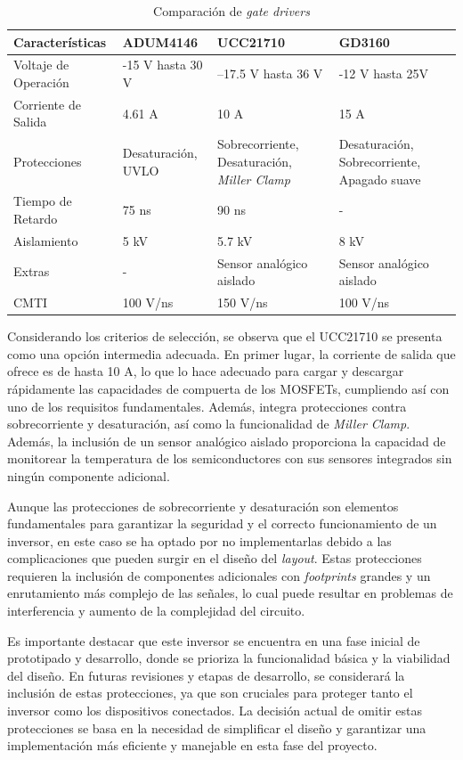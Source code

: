 \begin{table}[H]
	\centering
	\begin{tabular}{|l|p{3.5cm}|p{3.5cm}|p{3.5cm}|}
		\hline
		\textbf{Características} & \textbf{ADUM4146} & \textbf{UCC21710} & \textbf{GD3160} \\
		\hline
		Voltaje de Operación & -15 V hasta 30 V & –17.5 V hasta 36 V & -12 V hasta 25V \\
		\hline
		Corriente de Salida & 4.61 A & 10 A & 15 A \\
		\hline
		Protecciones & Desaturación, UVLO & Sobrecorriente, Desaturación, \textit{Miller Clamp} & Desaturación, Sobrecorriente, Apagado suave \\
		\hline
		Tiempo de Retardo & 75 ns & 90 ns & - \\
		\hline
		Aislamiento & 5 kV & 5.7 kV & 8 kV \\
		\hline
		Extras & - & Sensor analógico aislado & Sensor analógico aislado \\
		\hline
		CMTI & 100 V/ns & 150 V/ns & 100 V/ns \\
		\hline
	\end{tabular}
	\caption{Comparación de \textit{gate drivers}}
\end{table}

Considerando los criterios de selección, se observa que el UCC21710 se presenta como una opción intermedia adecuada. En primer lugar, la corriente de salida que ofrece es de hasta 10 A, lo que lo hace adecuado para cargar y descargar rápidamente las capacidades de compuerta de los MOSFETs, cumpliendo así con uno de los requisitos fundamentales. Además, integra protecciones contra sobrecorriente y desaturación, así como la funcionalidad de \textit{Miller Clamp}. Además, la inclusión de un sensor analógico aislado proporciona la capacidad de monitorear la temperatura de los semiconductores con sus sensores integrados sin ningún componente adicional.

Aunque las protecciones de sobrecorriente y desaturación son elementos fundamentales para garantizar la seguridad y el correcto funcionamiento de un inversor, en este caso se ha optado por no implementarlas debido a las complicaciones que pueden surgir en el diseño del \textit{layout}. Estas protecciones requieren la inclusión de componentes adicionales con \textit{footprints} grandes y un enrutamiento más complejo de las señales, lo cual puede resultar en problemas de interferencia y aumento de la complejidad del circuito.

Es importante destacar que este inversor se encuentra en una fase inicial de prototipado y desarrollo, donde se prioriza la funcionalidad básica y la viabilidad del diseño. En futuras revisiones y etapas de desarrollo, se considerará la inclusión de estas protecciones, ya que son cruciales para proteger tanto el inversor como los dispositivos conectados. La decisión actual de omitir estas protecciones se basa en la necesidad de simplificar el diseño y garantizar una implementación más eficiente y manejable en esta fase del proyecto.

